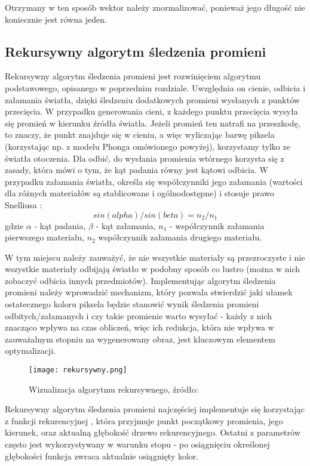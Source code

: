 Otrzymany w ten sposób wektor należy znormalizować, ponieważ jego długość nie koniecznie jest równa jeden.

 
\subsection{Rekursywny algorytm śledzenia promieni}

Rekursywny algorytm śledzenia promieni \cite{foley95} jest rozwinięciem algorytmu podstawowego, opisanego w poprzednim rozdziale. Uwzględnia on cienie, odbicia i załamania światła, dzięki śledzeniu dodatkowych promieni wysłanych z punktów przecięcia. W przypadku generowania cieni, z każdego punktu przecięcia wysyła się promień w kierunku źródła światła. Jeżeli promień ten natrafi na przeszkodę, to znaczy, że punkt znajduje się w cieniu, a więc wyliczając barwę piksela (korzystając np. z modelu Phonga omówionego powyżej), korzystamy tylko ze światła otoczenia. Dla odbić, do wysłania promienia wtórnego korzysta się z zasady, która mówi o tym, że kąt padania równy jest kątowi odbicia. W przypadku załamania światła, określa się współczynniki jego załamania (wartości dla różnych materiałów są stablicowane i ogólnodostępne) i stosuje prawo Snelliusa \cite{snellius}:
$$sin(alpha)/sin(beta) = n_2/n_1$$
gdzie $\alpha$ - kąt padania, $\beta$ - kąt załamania, $n_1$ - współczynnik załamania pierwszego materiału, $n_2$ współczynnik załamania drugiego materiału.


W tym miejscu należy zauważyć, że nie wszystkie materiały są przezroczyste i nie wszystkie materiały odbijają światło w podobny sposób co lustro (można w nich zobaczyć odbicia innych przedmiotów). Implementując algorytm śledzenia promieni należy wprowadzić mechanizm, który pozwala stwierdzić jaki ułamek ostatecznego koloru piksela będzie stanowić wynik śledzenia promieni odbitych/załamanych i czy takie promienie warto wysyłać - każdy z nich znacząco wpływa na czas obliczeń, więc ich redukcja, która nie wpływa w zauważalnym stopniu na wygenerowany obraz, jest kluczowym elementem optymalizacji.


\begin{figure}[h!]
\centering
  \caption{Wizualizacja algorytmu rekursywnego, źródło: \cite{scratch}}
  \texttt{[image: rekursywny.png]}
\end{figure}

Rekursywny algorytm śledzenia promieni najczęściej implementuje się korzystając z funkcji rekurencyjnej \cite{suffern2007}, która przyjmuje punkt początkowy promienia, jego kierunek, oraz aktualną głębokość drzewo rekurencyjnego. Ostatni z parametrów często jest wykorzystywany w warunku stopu - po osiągnięciu określonej głębokości funkcja zwraca aktualnie osiągnięty kolor.


